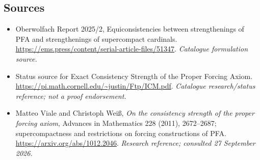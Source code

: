 \documentclass[11pt,a4paper]{article}
\numberwithin{equation}{section}
\begin{document}
\subsection{Sources}
\begin{itemize}\raggedright
\item[\textnormal{[S1]}]\hypertarget{source:statement:1}{} Oberwolfach Report 2025/2, Equiconsistencies between strengthenings of PFA and strengthenings of supercompact cardinals.
\url{https://ems.press/content/serial-article-files/51347}.
{\small\textit{Catalogue formulation source.}}
\item[\textnormal{[S2]}]\hypertarget{source:statement:2}{} Status source for Exact Consistency Strength of the Proper Forcing Axiom.
\url{https://pi.math.cornell.edu/~justin/Ftp/ICM.pdf}.
{\small\textit{Catalogue research/status reference; not a proof endorsement.}}
\item[\textnormal{[E1]}]\hypertarget{extra:statement:1}{} Matteo Viale and Christoph Wei\ss, \emph{On the consistency strength of the proper forcing axiom}, Advances in Mathematics 228 (2011), 2672--2687; supercompactness and restrictions on forcing constructions of PFA.
\url{https://arxiv.org/abs/1012.2046}.
{\small\textit{Research reference; consulted 27 September 2026.}}
\end{itemize}
\end{document}
